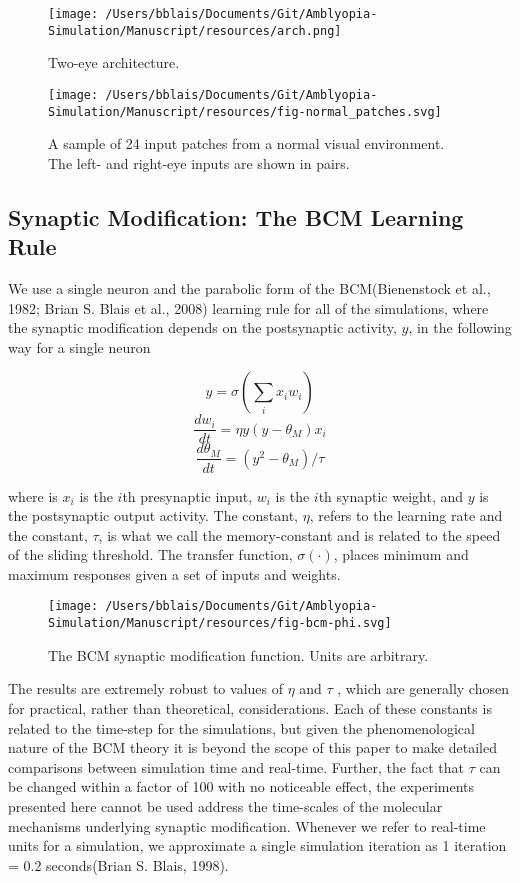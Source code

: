 \documentclass[
  onecolumn]{article}
\begin{document}
\begin{figure}
\hypertarget{fig:arch}{%
\centering
\texttt{[image: /Users/bblais/Documents/Git/Amblyopia-Simulation/Manuscript/resources/arch.png]}
\caption{Two-eye architecture.}\label{fig:arch}
}
\end{figure}

\begin{figure}
\hypertarget{fig:normal-inputs}{%
\centering
\texttt{[image: /Users/bblais/Documents/Git/Amblyopia-Simulation/Manuscript/resources/fig-normal\_patches.svg]}
\caption{A sample of 24 input patches from a normal visual environment.
The left- and right-eye inputs are shown in
pairs.}\label{fig:normal-inputs}
}
\end{figure}

\hypertarget{synaptic-modification-the-bcm-learning-rule}{%
\subsection{Synaptic Modification: The BCM Learning
Rule}\label{synaptic-modification-the-bcm-learning-rule}}

We use a single neuron and the parabolic form of the BCM(Bienenstock et
al., 1982; Brian S. Blais et al., 2008) learning rule for all of the
simulations, where the synaptic modification depends on the postsynaptic
activity, \(y\), in the following way for a single neuron

\[
y=\sigma\left(\sum_i x_i w_i \right)
\] \[
\frac{dw_i}{dt} = \eta y(y-\theta_M) x_i
\] \[
\frac{d\theta_M}{dt} = (y^2-\theta_M)/\tau
\]

where is \(x_i\) is the \(i\)th presynaptic input, \(w_i\) is the
\(i\)th synaptic weight, and \(y\) is the postsynaptic output activity.
The constant, \(\eta\), refers to the learning rate and the constant,
\(\tau\), is what we call the memory-constant and is related to the
speed of the sliding threshold. The transfer function,
\(\sigma(\cdot)\), places minimum and maximum responses given a set of
inputs and weights.

\begin{figure}
\hypertarget{fig:bcm-phi}{%
\centering
\texttt{[image: /Users/bblais/Documents/Git/Amblyopia-Simulation/Manuscript/resources/fig-bcm-phi.svg]}
\caption{The BCM synaptic modification function. Units are
arbitrary.}\label{fig:bcm-phi}
}
\end{figure}

The results are extremely robust to values of \(\eta\) and \(\tau\) ,
which are generally chosen for practical, rather than theoretical,
considerations. Each of these constants is related to the time-step for
the simulations, but given the phenomenological nature of the BCM theory
it is beyond the scope of this paper to make detailed comparisons
between simulation time and real-time. Further, the fact that \(\tau\)
can be changed within a factor of 100 with no noticeable effect, the
experiments presented here cannot be used address the time-scales of the
molecular mechanisms underlying synaptic modification. Whenever we refer
to real-time units for a simulation, we approximate a single simulation
iteration as 1 iteration = 0.2 seconds(Brian S. Blais, 1998).
\end{document}
